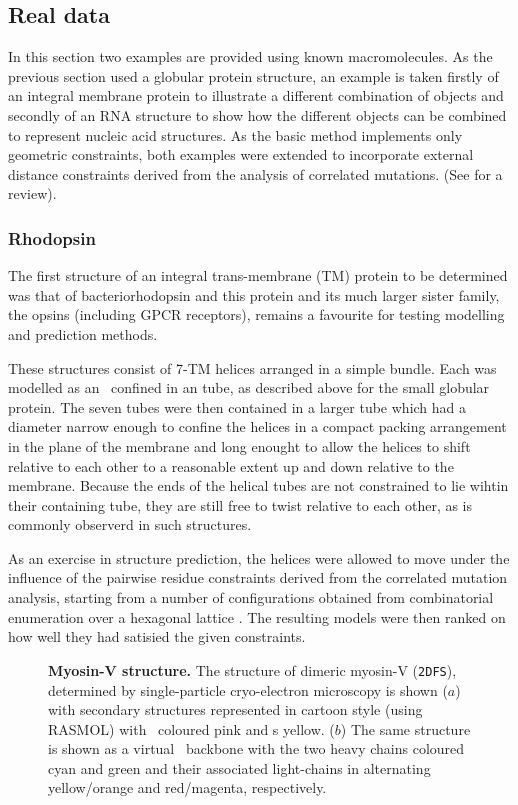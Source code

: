 \subsection{Real data}

In this section two examples are provided using known macromolecules.
As the previous section used a globular protein structure, an example is
taken firstly of an integral membrane protein to illustrate a different 
combination of objects and secondly of an RNA structure to show how the
different objects can be combined to represent nucleic acid structures.
As the basic method implements only geometric constraints, both examples
were extended to incorporate external distance constraints derived from
the analysis of correlated mutations.  (See \cite{} for a review).

\subsubsection{Rhodopsin}

The first structure of an integral trans-membrane (TM) protein to be determined was
that of bacteriorhodopsin and this protein and its much larger sister family,
the opsins (including GPCR receptors), remains a favourite for testing
modelling and prediction methods.

These structures consist of 7-TM helices arranged in a simple bundle.  Each
was modelled as an \AH\ confined in an tube, as described above for the
small globular protein.   The seven tubes were then contained in a larger
tube which had a diameter narrow enough to confine the helices in a compact
packing arrangement in the plane of the membrane and long enought to allow 
the helices to shift relative to each other to a reasonable extent up and
down relative to the membrane.   Because the ends of the helical tubes are
not constrained to lie wihtin their containing tube, they are still free to 
twist relative to each other, as is commonly observerd in such structures.

As an exercise in structure prediction, the helices were allowed to move
under the influence of the pairwise residue constraints derived from the
correlated mutation analysis, starting from a number of configurations
obtained from combinatorial enumeration over a hexagonal lattice \cite{}.
The resulting models were then ranked on how well they had satisied the
given constraints.

\begin{figure}
\centering
{}
\caption{
\label{Fig:myo2DFS}
{\bf Myosin-V structure.}
The structure of dimeric myosin-V ({\tt 2DFS}), determined by single-particle cryo-electron microscopy
is shown ($a$) with secondary structures represented in cartoon style (using {\small RASMOL}) with
\AH\ coloured pink and \Bs s yellow.  ($b$) The same structure is shown as a virtual \CA\
backbone with the two heavy chains coloured cyan and green and their associated light-chains
in alternating yellow/orange and red/magenta, respectively.
}
\end{figure}

